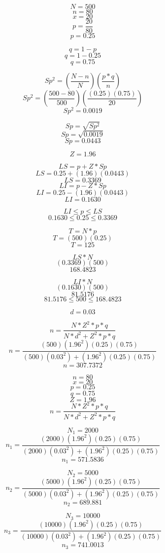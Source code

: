 $$N = 500$$
$$n = 80$$
$$x = 20$$
$$p = \frac{20}{80}$$
$$p = 0.25$$

$$q = 1 - p$$
$$q = 1 - 0.25$$
$$q = 0.75$$

$$Sp^{2} = (\frac{N - n}{N})(\frac{p*q}{n})$$
$$Sp^{2} = (\frac{500 - 80}{500})(\frac{(0.25)(0.75)}{20})$$
$$Sp^{2} = 0.0019$$

$$Sp = \sqrt{Sp^{2}}$$
$$Sp = \sqrt{0.0019}$$
$$Sp = 0.0443$$

$$Z = 1.96$$

$$LS = p + Z*Sp$$
$$LS = 0.25 + (1.96)(0.0443)$$
$$LS = 0.3369$$
$$LI = p - Z*Sp$$
$$LI = 0.25 - (1.96)(0.0443)$$
$$LI = 0.1630$$

$$LI \leqslant p \leqslant LS$$
$$0.1630 \leqslant 0.25 \leqslant 0.3369$$

$$T = N*p$$
$$T = (500)(0.25)$$
$$T = 125$$

$$LS*N$$
$$(0.3369)(500)$$
$$168.4823$$

$$LI*N$$
$$(0.1630)(500)$$
$$81.5176$$
$$81.5176 \leqslant 500 \leqslant 168.4823$$


$$d = 0.03$$

$$n = \frac{N*Z^{2}*p*q}{N*d^{2}+Z^{2}*p*q}$$
$$n = \frac{(500)(1.96^{2})(0.25)(0.75)}{(500)(0.03^{2})+(1.96^{2})(0.25)(0.75)}$$
$$n = 307.7372$$

$$n = 80$$
$$x = 20$$
$$p = 0.25$$
$$q = 0.75$$
$$Z = 1.96$$
$$n = \frac{N*Z^{2}*p*q}{N*d^{2}+Z^{2}*p*q}$$

$$N_{1} = 2000$$
$$n_{1} = \frac{(2000)(1.96^{2})(0.25)(0.75)}{(2000)(0.03^{2})+(1.96^{2})(0.25)(0.75)}$$
$$n_{1} = 571.5836$$

$$N_{2} = 5000$$
$$n_{2} = \frac{(5000)(1.96^{2})(0.25)(0.75)}{(5000)(0.03^{2})+(1.96^{2})(0.25)(0.75)}$$
$$n_{2} = 689.881$$

$$N_{3} = 10000$$
$$n_{3} = \frac{(10000)(1.96^{2})(0.25)(0.75)}{(10000)(0.03^{2})+(1.96^{2})(0.25)(0.75)}$$
$$n_{3} = 741.0013$$
